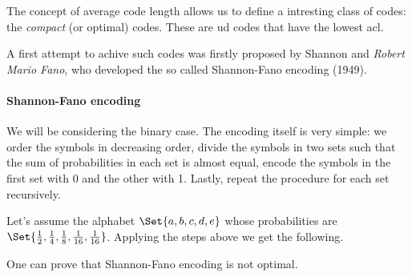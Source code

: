 \documentclass{subfiles}
\begin{document}
    The concept of average code length allows us to define a intresting class of 
        codes: the \emph{compact} (or optimal) codes.
        These are \gls{ud} codes that have the lowest \gls{acl}.
    
    A first attempt to achive such codes was firstly proposed by Shannon 
        and \emph{Robert Mario Fano}, who developed the so called Shannon-Fano 
        encoding (1949).

    \paragraph{Shannon-Fano encoding}
    We will be considering the binary case. 
    The encoding itself is very simple: we order the symbols in decreasing order,
    divide the symbols in two sets such that the sum of probabilities in each set 
    is almost equal, encode the symbols in the first set with 0 and the other with 1.
    Lastly, repeat the procedure for each set recursively.
    \begin{example*}
        Let's assume the alphabet \(\Set{a, b, c, d, e}\) whose probabilities are
            \(\Set{\tfrac{1}{2}, \tfrac{1}{4}, \tfrac{1}{8},
                \tfrac{1}{16}, \tfrac{1}{16}}\). 
            Applying the steps above we get the following. 
            
    \end{example*}
    One can prove that Shannon-Fano encoding is not optimal.
    \clearpage
\end{document}
